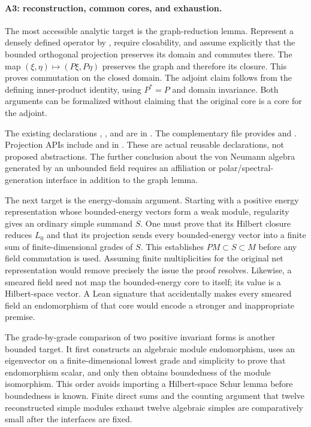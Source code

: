 \paragraph{A3: reconstruction, common cores, and exhaustion.}
The most accessible analytic target is the graph-reduction lemma.
Represent a densely defined operator by , require
closability, and assume explicitly that the bounded orthogonal
projection preserves its domain and commutes there. The map
$(\xi,\eta)\mapsto(P\xi,P\eta)$ preserves the graph and therefore its
closure. This proves commutation on the closed domain. The adjoint
claim follows from the defining inner-product identity, using
$P^*=P$ and domain invariance. Both arguments can be formalized without
claiming that the original core is a core for the adjoint.

The existing declarations
,
, and
 are in
.
The complementary file
 provides
 and
.
Projection APIs include 
and  in
.
These are actual reusable declarations, not proposed abstractions.
The further conclusion about the von Neumann algebra generated by an
unbounded field requires an affiliation or polar/spectral-generation
interface in addition to the graph lemma.

The next target is the energy-domain argument. Starting with a positive
energy representation whose bounded-energy vectors form a weak module,
regularity gives an ordinary simple summand $S$. One must prove that
its Hilbert closure reduces $L_0$ and that its projection sends every
bounded-energy vector into a finite sum of finite-dimensional grades
of $S$. This establishes $PM\subset S\subset M$ before any field
commutation is used. Assuming finite multiplicities for the original
net representation would remove precisely the issue the proof resolves.
Likewise, a smeared field need not map the bounded-energy core to
itself; its value is a Hilbert-space vector. A Lean signature that
accidentally makes every smeared field an endomorphism of that core
would encode a stronger and inappropriate premise.

The grade-by-grade comparison of two positive invariant forms is another
bounded target. It first constructs an algebraic module endomorphism,
uses an eigenvector on a finite-dimensional lowest grade and simplicity
to prove that endomorphism scalar, and only then obtains boundedness of
the module isomorphism. This order avoids importing a Hilbert-space
Schur lemma before boundedness is known. Finite direct sums and the
counting argument that twelve reconstructed simple modules exhaust
twelve algebraic simples are comparatively small after the interfaces
are fixed.

